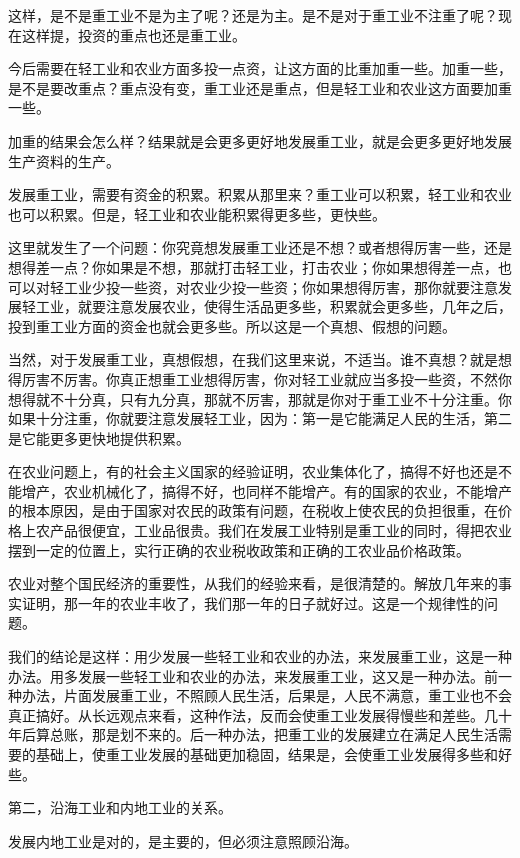 这样，是不是重工业不是为主了呢？还是为主。是不是对于重工业不注重了呢？现在这样提，投资的重点也还是重工业。

今后需要在轻工业和农业方面多投一点资，让这方面的比重加重一些。加重一些，是不是要改重点？重点没有变，重工业还是重点，但是轻工业和农业这方面要加重一些。

加重的结果会怎么样？结果就是会更多更好地发展重工业，就是会更多更好地发展生产资料的生产。

发展重工业，需要有资金的积累。积累从那里来？重工业可以积累，轻工业和农业也可以积累。但是，轻工业和农业能积累得更多些，更快些。

这里就发生了一个问题：你究竟想发展重工业还是不想？或者想得厉害一些，还是想得差一点？你如果是不想，那就打击轻工业，打击农业；你如果想得差一点，也可以对轻工业少投一些资，对农业少投一些资；你如果想得厉害，那你就要注意发展轻工业，就要注意发展农业，使得生活品更多些，积累就会更多些，几年之后，投到重工业方面的资金也就会更多些。所以这是一个真想、假想的问题。

当然，对于发展重工业，真想假想，在我们这里来说，不适当。谁不真想？就是想得厉害不厉害。你真正想重工业想得厉害，你对轻工业就应当多投一些资，不然你想得就不十分真，只有九分真，那就不厉害，那就是你对于重工业不十分注重。你如果十分注重，你就要注意发展轻工业，因为：第一是它能满足人民的生活，第二是它能更多更快地提供积累。

在农业问题上，有的社会主义国家的经验证明，农业集体化了，搞得不好也还是不能增产，农业机械化了，搞得不好，也同样不能增产。有的国家的农业，不能增产的根本原因，是由于国家对农民的政策有问题，在税收上使农民的负担很重，在价格上农产品很便宜，工业品很贵。我们在发展工业特别是重工业的同时，得把农业摆到一定的位置上，实行正确的农业税收政策和正确的工农业品价格政策。

农业对整个国民经济的重要性，从我们的经验来看，是很清楚的。解放几年来的事实证明，那一年的农业丰收了，我们那一年的日子就好过。这是一个规律性的问题。

我们的结论是这样：用少发展一些轻工业和农业的办法，来发展重工业，这是一种办法。用多发展一些轻工业和农业的办法，来发展重工业，这又是一种办法。前一种办法，片面发展重工业，不照顾人民生活，后果是，人民不满意，重工业也不会真正搞好。从长远观点来看，这种作法，反而会使重工业发展得慢些和差些。几十年后算总账，那是划不来的。后一种办法，把重工业的发展建立在满足人民生活需要的基础上，使重工业发展的基础更加稳固，结果是，会使重工业发展得多些和好些。

第二，沿海工业和内地工业的关系。

发展内地工业是对的，是主要的，但必须注意照顾沿海。

